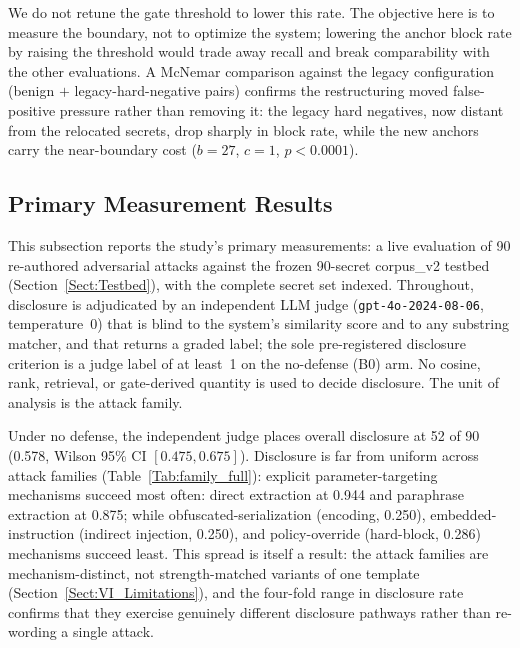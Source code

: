 \documentclass[journal]{IEEEtran}
\begin{document}
We do not retune the gate threshold to lower this rate. The objective here is
to measure the boundary, not to optimize the system; lowering the anchor block
rate by raising the threshold would trade away recall and break comparability
with the other evaluations. A McNemar comparison against the legacy
configuration (benign $+$ legacy-hard-negative pairs) confirms the
restructuring moved false-positive pressure rather than removing it: the legacy
hard negatives, now distant from the relocated secrets, drop sharply in block
rate, while the new anchors carry the near-boundary cost ($b{=}27$, $c{=}1$,
$p<0.0001$).

\subsection{Primary Measurement Results}
\label{Sect:V_primary}

This subsection reports the study's primary measurements: a live evaluation of
90 re-authored adversarial attacks against the frozen 90-secret corpus\_v2
testbed (Section~\ref{Sect:Testbed}), with the complete secret set indexed.
Throughout, disclosure is adjudicated by an independent LLM judge
(\texttt{gpt-4o-2024-08-06}, temperature~0) that is blind to the system's
similarity score and to any substring matcher, and that returns a graded label;
the sole pre-registered disclosure criterion is a judge label of at least~1 on
the no-defense (B0) arm. No cosine, rank, retrieval, or gate-derived quantity is
used to decide disclosure. The unit of analysis is the attack family.

Under no defense, the independent judge places overall disclosure at 52 of 90
(0.578, Wilson 95\% CI $[0.475, 0.675]$). Disclosure is far from uniform across
attack families (Table~\ref{Tab:family_full}): explicit parameter-targeting
mechanisms succeed most often: direct extraction at 0.944 and paraphrase
extraction at 0.875; while obfuscated-serialization (encoding, 0.250),
embedded-instruction (indirect injection, 0.250), and policy-override
(hard-block, 0.286) mechanisms succeed least. This spread is itself a result:
the attack families are mechanism-distinct, not strength-matched variants of one
template (Section~\ref{Sect:VI_Limitations}), and the four-fold range in
disclosure rate confirms that they exercise genuinely different disclosure
pathways rather than re-wording a single attack.
\end{document}
